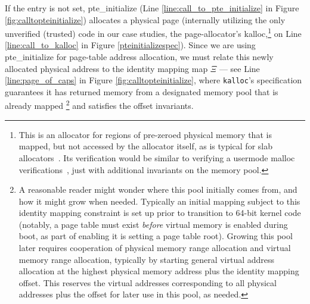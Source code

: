 If the entry is not set, \textsf{pte\_initialize} (Line \ref{line:call_to_pte_initialize} in Figure \ref{fig:calltopteinitialize}) 
allocates a physical page (internally utilizing the only unverified (trusted) code in our case studies, the page-allocator's \textsf{kalloc},\footnote{
  This is an allocator for regions of pre-zeroed physical memory that is mapped, but not accessed by the allocator itself,
  as is typical for slab allocators~\cite{bonwick1994slab}.
  Its verification would be similar to verifying a usermode \textsf{malloc} verifications~\cite{Chlipala2013Bedrock,wickerson2010explicit},
  just with additional invariants on the memory pool.
} 
on Line \ref{line:call_to_kalloc} in Figure \ref{pteinitializespec}). 
Since we are using \textsf{pte\_initialize} for page-table address allocation, we must relate this newly
allocated physical address to the identity mapping map $\Xi$ --- 
see Line \ref{line:page_of_caps} in Figure \ref{fig:calltopteinitialize}, where
\texttt{kalloc}'s specification guarantees it has returned memory from a designated memory
pool that is already mapped
\ifPLDI
\else
\footnote{A reasonable reader might wonder where this pool
initially comes from, and how it might grow when needed. Typically an initial mapping subject to this identity mapping
constraint is set up prior to transition to 64-bit kernel code (notably,
a page table must exist \emph{before} virtual memory is enabled during boot, as part of enabling it is setting
a page table root).
Growing this pool later requires cooperation of physical memory range allocation and virtual memory range allocation,
typically by starting general virtual address allocation at the highest physical memory address plus the identity mapping offset.
This reserves the virtual addresses corresponding to all physical addresses plus the offset for later use in this pool,
as needed.
} 
\fi
and satisfies the offset invariants.
